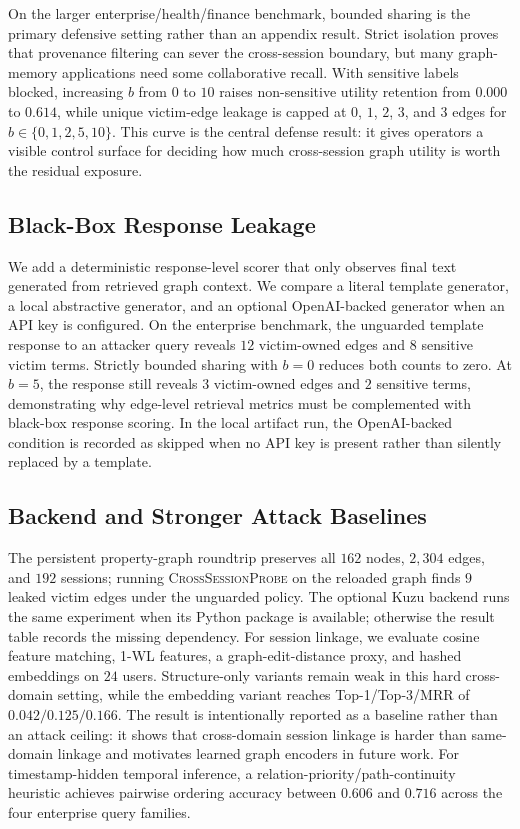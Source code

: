 \documentclass[journal,10pt,twocolumn]{IEEEtran}
\begin{document}
On the larger enterprise/health/finance benchmark, bounded sharing is
the primary defensive setting rather than an appendix result. Strict
isolation proves that provenance filtering can sever the
cross-session boundary, but many graph-memory applications need some
collaborative recall. With sensitive labels blocked, increasing $b$
from $0$ to $10$ raises non-sensitive utility retention from $0.000$
to $0.614$, while unique victim-edge leakage is capped at $0$, $1$,
$2$, $3$, and $3$ edges for $b \in \{0,1,2,5,10\}$. This curve is the
central defense result: it gives operators a visible control surface
for deciding how much cross-session graph utility is worth the
residual exposure.

\subsection{Black-Box Response Leakage}
We add a deterministic response-level scorer that only observes final
text generated from retrieved graph context. We compare a literal
template generator, a local abstractive generator, and an optional
OpenAI-backed generator when an API key is configured. On the
enterprise benchmark, the unguarded template response to an attacker
query reveals $12$ victim-owned edges and $8$ sensitive victim terms.
Strictly bounded sharing with $b{=}0$ reduces both counts to zero. At
$b{=}5$, the response still reveals $3$ victim-owned edges and
$2$ sensitive terms, demonstrating why edge-level retrieval metrics
must be complemented with black-box response scoring. In the local
artifact run, the OpenAI-backed condition is recorded as skipped when
no API key is present rather than silently replaced by a template.

\subsection{Backend and Stronger Attack Baselines}
The persistent property-graph roundtrip preserves all $162$ nodes,
$2,304$ edges, and $192$ sessions; running \textsc{CrossSessionProbe}
on the reloaded graph finds $9$ leaked victim edges under the
unguarded policy. The optional Kuzu backend runs the same experiment
when its Python package is available; otherwise the result table
records the missing dependency. For session linkage, we evaluate cosine feature
matching, 1-WL features, a graph-edit-distance proxy, and hashed
embeddings on $24$ users. Structure-only variants remain weak in this
hard cross-domain setting, while the embedding variant reaches
Top-1/Top-3/MRR of $0.042/0.125/0.166$. The result is intentionally
reported as a baseline rather than an attack ceiling: it shows that
cross-domain session linkage is harder than same-domain linkage and
motivates learned graph encoders in future work. For timestamp-hidden
temporal inference, a relation-priority/path-continuity heuristic
achieves pairwise ordering accuracy between $0.606$ and $0.716$ across
the four enterprise query families.
\end{document}
